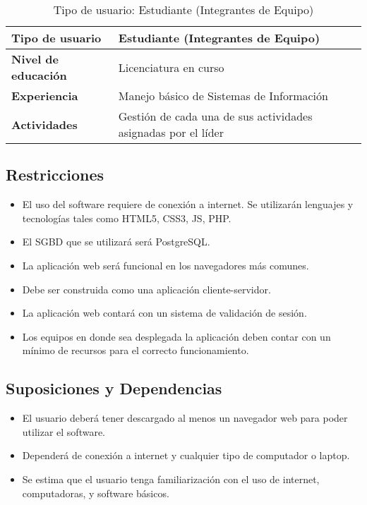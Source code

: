 	\begin{table}[h!]
		\centering
		\begin{tabular}{|l|p{11cm}|}
			\hline
			\textbf{Tipo de usuario}    & \textbf{Estudiante (Integrantes de Equipo)}                   \\
			\hline
			\textbf{Nivel de educación} & Licenciatura en curso                                         \\
			\hline
			\textbf{Experiencia}        & Manejo básico de Sistemas de Información                      \\
			\hline
			\textbf{Actividades}        & Gestión de cada una de sus actividades asignadas por el líder \\
			\hline
		\end{tabular}
		\caption{Tipo de usuario: Estudiante (Integrantes de Equipo)}
	\end{table}

	\subsection{Restricciones}

	\begin{itemize}
		\item El uso del software requiere de conexión a internet. Se utilizarán
			lenguajes y tecnologías tales como HTML5, CSS3, JS, PHP.

		\item El SGBD que se utilizará será PostgreSQL.

		\item La aplicación web será funcional en los navegadores más comunes.

		\item Debe ser construida como una aplicación cliente-servidor.

		\item La aplicación web contará con un sistema de validación de sesión.

		\item Los equipos en donde sea desplegada la aplicación deben contar con un mínimo
			de recursos para el correcto funcionamiento.
	\end{itemize}

	\subsection{Suposiciones y Dependencias}

	\begin{itemize}
		\item El usuario deberá tener descargado al menos un navegador web para poder
			utilizar el software.

		\item Dependerá de conexión a internet y cualquier tipo de computador o laptop.

		\item Se estima que el usuario tenga familiarización con el uso de internet,
			computadoras, y software básicos.
	\end{itemize}

